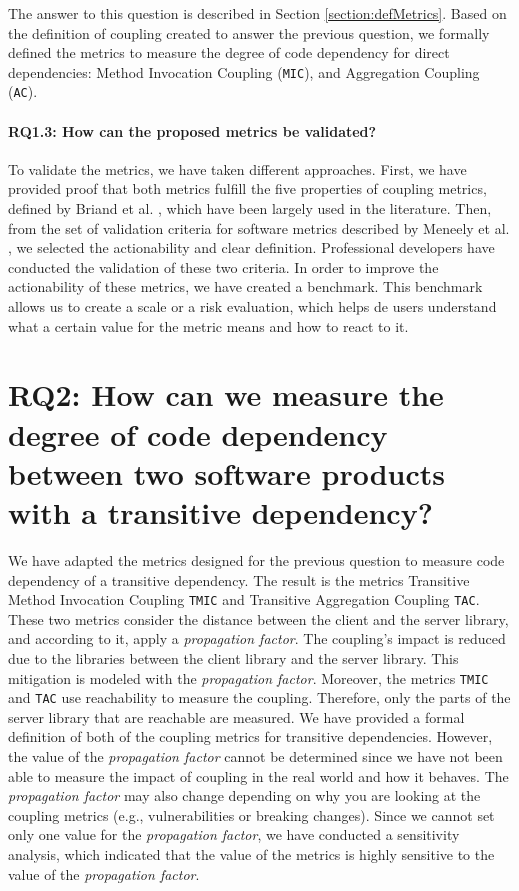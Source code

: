 The answer to this question is described in Section \ref{section:defMetrics}. Based on the definition of coupling created to answer the previous question, we formally defined the metrics to measure the degree of code dependency for direct dependencies: Method Invocation Coupling (\texttt{MIC}), and Aggregation Coupling (\texttt{AC}).

\paragraph{RQ1.3: How can the proposed metrics be validated?}

To validate the metrics, we have taken different approaches. First, we have provided proof that both metrics fulfill the five properties of coupling metrics, defined by Briand et al. \cite{briand1996property}, which have been largely used in the literature. Then, from the set of validation criteria for software metrics described by Meneely et al. \cite{Meneely2012}, we selected the actionability and clear definition. Professional developers have conducted the validation of these two criteria. In order to improve the actionability of these metrics, we have created a benchmark. This benchmark allows us to create a scale or a risk evaluation, which helps de users understand what a certain value for the metric means and how to react to it.

\section{RQ2: How can we measure the degree of code dependency between two software products with a transitive dependency?}

We have adapted the metrics designed for the previous question to measure code dependency of a transitive dependency. The result is the metrics Transitive Method Invocation Coupling \texttt{TMIC} and Transitive Aggregation Coupling \texttt{TAC}. These two metrics consider the distance between the client and the server library, and according to it, apply a \textit{propagation factor}. The coupling's impact is reduced due to the libraries between the client library and the server library. This mitigation is modeled with the \textit{propagation factor}. Moreover, the metrics \texttt{TMIC} and \texttt{TAC} use reachability to measure the coupling. Therefore, only the parts of the server library that are reachable are measured. We have provided a formal definition of both of the coupling metrics for transitive dependencies. However, the value of the \textit{propagation factor} cannot be determined since we have not been able to measure the impact of coupling in the real world and how it behaves. The \textit{propagation factor} may also change depending on why you are looking at the coupling metrics (e.g., vulnerabilities or breaking changes). Since we cannot set only one value for the \textit{propagation factor}, we have conducted a sensitivity analysis, which indicated that the value of the metrics is highly sensitive to the value of the \textit{propagation factor}.

